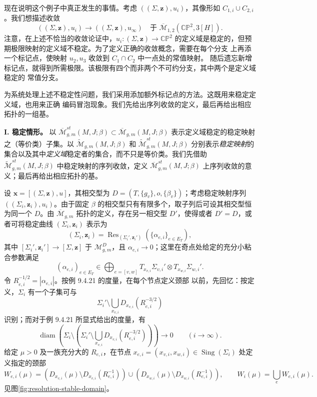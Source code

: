 \begin{example}
现在说明这个例子中真正发生的事情。考虑 $((\Sigma,\boldsymbol z),u_i)$，其像形如
$C_{1,i}\cup C_{2,i}$。我们想描述收敛
\[
 ((\Sigma,\boldsymbol z),u_i)\longrightarrow
 ((\Sigma,\boldsymbol z),u_\infty)
 \quad\text{于 }\overline{\mathcal M}_{1,2}(\mathbb{CP}^2,3[H]).
\]
注意，在上述不恰当的收敛论证中，$u_i:(\Sigma,\boldsymbol z)\to\mathbb{CP}^2$
的定义域是稳定的，但预期极限映射的定义域不稳定。为了定义正确的收敛概念，需要在每个分支
上再添一个标记点，使映射 $u_2,u_3$ 收敛到 $C_1\cap C_2$ 中一点处的常值映射。
随后遗忘新增标记点，就得到所需极限。该极限有四个而非两个不可约分支，其中两个是定义域稳定的
常值分支。

为系统处理上述不稳定性问题，我们采用添加额外标记点的方法。这既用来稳定定义域，也用来正确
编码冒泡现象。我们先给出序列收敛的定义，最后再给出相应拓扑的一组基。
\end{example}

\textbf{I. 稳定情形。}
以
$\overline{\mathcal M}_{g,m}^{st}(M,J;\beta)
\subset\overline{\mathcal M}_{g,m}(M,J;\beta)$
表示定义域稳定的稳定映射之（等价类）子集。以
$\widetilde{\mathcal M}_{g,m}(M,J;\beta)$ 和
$\widetilde{\mathcal M}_{g,m}^{st}(M,J;\beta)$
分别表示\emph{稳定映射}的集合以及其中\emph{定义域}稳定者的集合，而不只是等价类。我们先借助
$\widetilde{\mathcal M}_{g,m}^{st}(M,J;\beta)$ 中稳定映射的序列收敛，定义
$\overline{\mathcal M}_{g,m}^{st}(M,J;\beta)$ 上序列收敛的意义；最后再给出相应拓扑的基。

设 $\mathbf x=[(\Sigma,\boldsymbol z),u]$，其相交型为
$D=(T,\{g_v\},o,\{\beta_v\})$；考虑稳定映射序列
$((\Sigma_i,\boldsymbol z_i),u_i)$。由于固定 $\beta$ 的相交型只有有限多个，取子列后可设其相交型恒为同一个
$D$。由
$\overline{\mathcal M}_{g,m}$ 拓扑的定义，存在另一相交型
$D'$，使得或者 $D'=D$，或者可将稳定曲线
$(\Sigma_i,\boldsymbol z_i)$ 表示为
\[
 (\Sigma_i,\boldsymbol z_i)=
 \operatorname{Res}_{(\Sigma_i',\boldsymbol z_i')}
 (\{\alpha_{e,i}\}_{e\in E_T}),
\]
其中
$[\Sigma_i',\boldsymbol z_i']\to[\Sigma,\boldsymbol z]$ 于
$\mathcal M_{g,m}^D$，且 $\alpha_{e,i}\to0$；这里在奇点处给定的充分小粘合参数满足
\[
 (\alpha_{e,i})_{e\in E_T}\in
 \bigoplus_{e=[v,w]}T_{x_{v,i}}\Sigma_{v,i}'\otimes
 T_{x_{w,i}}\Sigma_{w,i}'.
\]
令
$R_{e,i}^{-1/2}=|\alpha_{e,i}|$。按例 9.4.21 的度量，在每个节点定义颈部
以前，先回忆：按定义，$\Sigma_i$ 有一个子集可与
\[
 \Sigma_i'\setminus\bigcup_{x_{v,i}}D_{x_{v,i}}(R_{e,i}^{-3/2})
\]
识别；而对于例 9.4.21 所显式给出的度量，有
\[
 \operatorname{diam}\!\left(
 \Sigma_i\setminus\left(
 \Sigma_i'\setminus\bigcup_{x_{v,i}}D_{x_{v,i}}(R_{e,i}^{-3/2})
 \right)\right)\longrightarrow0
 \qquad(i\to\infty).
\]
给定 $\mu>0$ 及一族充分大的 $R_{e,i}$，在节点
$x_{e,i}=(x_{v,i},x_{w,i})\in\operatorname{Sing}(\Sigma_i)$ 处定义指定的颈部
\[
 W_{e,i}(\mu)=
 (D_{x_{v,i}}(\mu)\setminus D_{x_{v,i}}(R_{e,i}^{-1}))
 \cup
 (D_{x_{w,i}}(\mu)\setminus D_{x_{w,i}}(R_{e,i}^{-1})),
 \qquad W_i(\mu)=\bigcup_eW_{e,i}(\mu).
\]
见图\ref{fig:resolution-stable-domain}。

